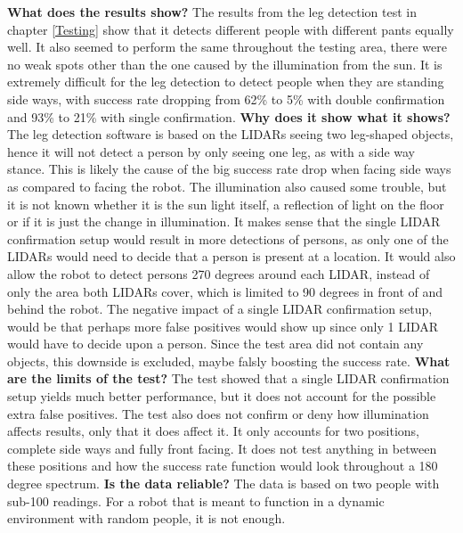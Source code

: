 \textbf{What does the results show?}
The results from the leg detection test in chapter \ref{Testing} show that it detects different people with different pants equally well. It also seemed to perform the same throughout the testing area, there were no weak spots other than the one caused by the illumination from the sun. It is extremely difficult for the leg detection to detect people when they are standing side ways, with success rate dropping from 62\% to 5\% with double confirmation and 93\% to 21\% with single confirmation.
\textbf{Why does it show what it shows?}
The leg detection software is based on the LIDARs seeing two leg-shaped objects, hence it will not detect a person by only seeing one leg, as with a side way stance. This is likely the cause of the big success rate drop when facing side ways as compared to facing the robot. The illumination also caused some trouble, but it is not known whether it is the sun light itself, a reflection of light on the floor or if it is just the change in illumination. It makes sense that the single LIDAR confirmation setup would result in more detections of persons, as only one of the LIDARs would need to decide that a person is present at a location. It would also allow the robot to detect persons 270 degrees around each LIDAR, instead of only the area both LIDARs cover, which is limited to 90 degrees in front of and behind the robot. The negative impact of a single LIDAR confirmation setup, would be that perhaps more false positives would show up since only 1 LIDAR would have to decide upon a person. Since the test area did not contain any objects, this downside is excluded, maybe falsly boosting the success rate.
\textbf{What are the limits of the test?}
The test showed that a single LIDAR confirmation setup yields much better performance, but it does not account for the possible extra false positives. The test also does not confirm or deny how illumination affects results, only that it does affect it. It only accounts for two positions, complete side ways and fully front facing. It does not test anything in between these positions and how the success rate function would look throughout a 180 degree spectrum.
\textbf{Is the data reliable?}
The data is based on two people with sub-100 readings. For a robot that is meant to function in a dynamic environment with random people, it is not enough. 



